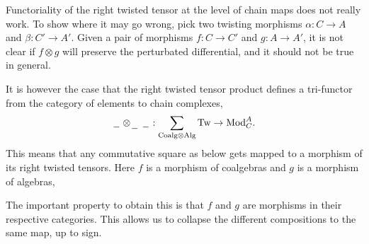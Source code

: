\documentclass[../thesis.tex]{subfiles}
\begin{document}
            Functoriality of the right twisted tensor at the level of chain maps does not really work. To show where it may go wrong, pick two twisting morphisms $\alpha : C \rightarrow A$ and $\beta : C' \rightarrow A'$. Given a pair of morphisms $f : C \rightarrow C'$ and $g : A \rightarrow A'$, it is not clear if $f\otimes g$ will preserve the perturbated differential, and it should not be true in general.

            It is however the case that the right twisted tensor product defines a tri-functor from the category of elements to chain complexes,
            \begin{align*}
                \hspace{0.05cm}\underline{\hspace{0.2cm}}\hspace{0.05cm}\otimes_{\hspace{0.05cm}\underline{\hspace{0.2cm}}\hspace{0.05cm}}\hspace{0.05cm}\underline{\hspace{0.2cm}}\hspace{0.05cm} : \sum_{\text{Coalg}\otimes\text{Alg}}\text{Tw} \rightarrow \text{Mod}_C^A\text{.}
            \end{align*}
            This means that any commutative square as below gets mapped to a morphism of its right twisted tensors. Here $f$ is a morphism of coalgebras and $g$ is a morphism of algebras,
            \begin{center}
                \quad\rightsquigarrow\quad
            \end{center}
            The important property to obtain this is that $f$ and $g$ are morphisms in their respective categories. This allows us to collapse the different compositions to the same map, up to sign.

\end{document}
